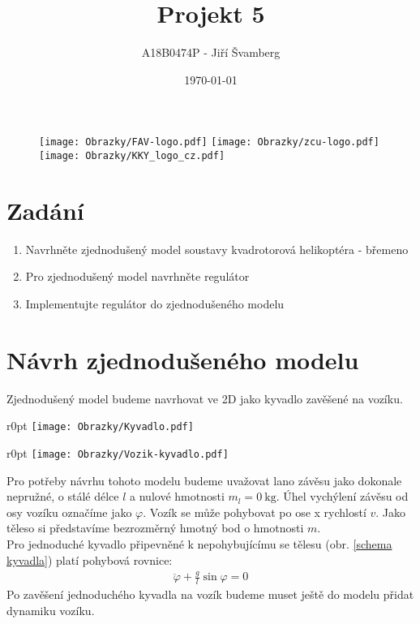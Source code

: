 \documentclass[a4paper, 12pt]{article}
\author{A18B0474P - Jiří Švamberg}
\title{Projekt 5}
\date{\today}
\begin{document}
	\begin{titlepage}
		\maketitle
		\begin{figure}
			\centering
			\texttt{[image: Obrazky/FAV-logo.pdf]}
			\texttt{[image: Obrazky/zcu-logo.pdf]}
			\texttt{[image: Obrazky/KKY\_logo\_cz.pdf]}
		\end{figure}
		\thispagestyle{empty}
		\newpage
	\end{titlepage}

	\tableofcontents
	\newpage
	\section{Zadání}
		\begin{enumerate}
			\item Navrhněte zjednodušený model soustavy kvadrotorová helikoptéra - břemeno\\
			\item Pro zjednodušený model navrhněte regulátor\\
			\item Implementujte regulátor do zjednodušeného modelu\\
		\end{enumerate}
		\clearpage
	\section{Návrh zjednodušeného modelu}
		Zjednodušený model budeme navrhovat ve 2D jako kyvadlo zavěšené na vozíku.
		\begin{wrapfigure}{r}{0pt}
			\texttt{[image: Obrazky/Kyvadlo.pdf]}
			\caption{Schéma jednoduchého kyvadla}
			\label{schema kyvadla}
		\end{wrapfigure}
		\begin{wrapfigure}{r}{0pt}
			\texttt{[image: Obrazky/Vozik-kyvadlo.pdf]}
			\caption{Schéma soustavy vozík-kyvadlo}
			\label{schema vozik-kyvadlo}
		\end{wrapfigure}
		Pro potřeby návrhu tohoto modelu budeme uvažovat lano závěsu jako dokonale nepružné, o stálé délce $l$ a nulové hmotnosti $m_l = \SI{0}{\kilogram}$. Úhel vychýlení závěsu od osy vozíku označíme jako $\varphi$. Vozík se může pohybovat po ose x rychlostí $v$. Jako těleso si představíme bezrozměrný hmotný bod o hmotnosti $m$.\\
		Pro jednoduché kyvadlo připevněné k nepohybujícímu se tělesu (obr. \ref{schema kyvadla}) platí pohybová rovnice:
		\begin{align*}
			\ddot{\varphi}+\frac{g}{l}\sin\varphi=0
		\end{align*}
		Po zavěšení jednoduchého kyvadla na vozík budeme muset ještě do modelu přidat dynamiku vozíku.
\end{document}
